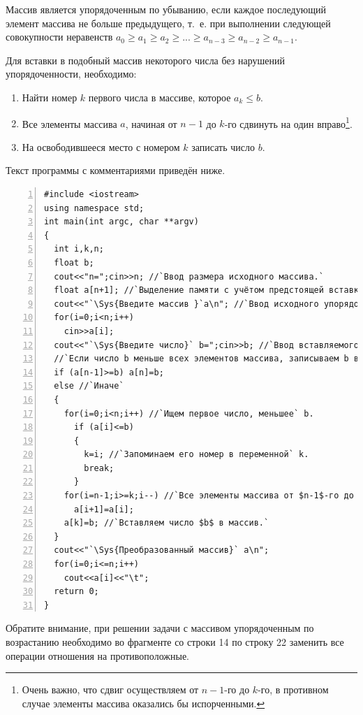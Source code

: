 Массив является упорядоченным по убыванию, если каждое последующий элемент массива не больше предыдущего, т.~е. при
выполнении следующей совокупности неравенств $a_0\geqslant a_1\geqslant a_2\geqslant ...\geqslant a_{n-3}\geqslant a_{n-2}\geqslant a_{n-1}$. 

Для вставки в подобный массив некоторого числа без нарушений упорядоченности, необходимо:

\begin{enumerate}
\item Найти номер $k$ первого числа в массиве, которое  $a_{k}\leqslant b$.
\item Все элементы массива $a$, начиная от $n-1$ до $k$-го сдвинуть
на один вправо\footnote{Очень важно, что сдвиг осуществляем от $n-1$-го до $k$-го, в противном случае элементы массива
оказались бы испорченными.}.
\item На освободившееся место с номером $k$ записать число $b$.
\end{enumerate}
Текст программы с комментариями приведён ниже.
\begin{lstlisting}[numbers=left, numberstyle=\tiny, stepnumber=2, numbersep=5pt] 
#include <iostream>
using namespace std;
int main(int argc, char **argv)
{
  int i,k,n;
  float b;
  cout<<"n=";cin>>n; //`Ввод размера исходного массива.`
  float a[n+1]; //`Выделение памяти с учётом предстоящей вставки одного числа в массив.`
  cout<<"`\Sys{Введите массив }`a\n"; //`Ввод исходного упорядоченного по убыванию массива.`
  for(i=0;i<n;i++)
    cin>>a[i];
  cout<<"`\Sys{Введите число}` b=";cin>>b; //`Ввод вставляемого в массив числа b`.
  //`Если число b меньше всех элементов массива, записываем b в последний элемент массива.`
  if (a[n-1]>=b) a[n]=b;
  else //`Иначе`
  {
    for(i=0;i<n;i++) //`Ищем первое число, меньшее` b.
      if (a[i]<=b) 
      {
        k=i; //`Запоминаем его номер в переменной` k.
        break;
      }
    for(i=n-1;i>=k;i--) //`Все элементы массива от $n-1$-го до $k$-го сдвигаем на один вправо.`
      a[i+1]=a[i];
    a[k]=b; //`Вставляем число $b$ в массив.`
  }
  cout<<"`\Sys{Преобразованный массив}` a\n";
  for(i=0;i<=n;i++)
    cout<<a[i]<<"\t";
  return 0;
}
\end{lstlisting}

Обратите внимание, при решении задачи с массивом упорядоченным по возрастанию необходимо во фрагменте со строки 14 по строку 22
заменить все операции отношения на противоположные.

